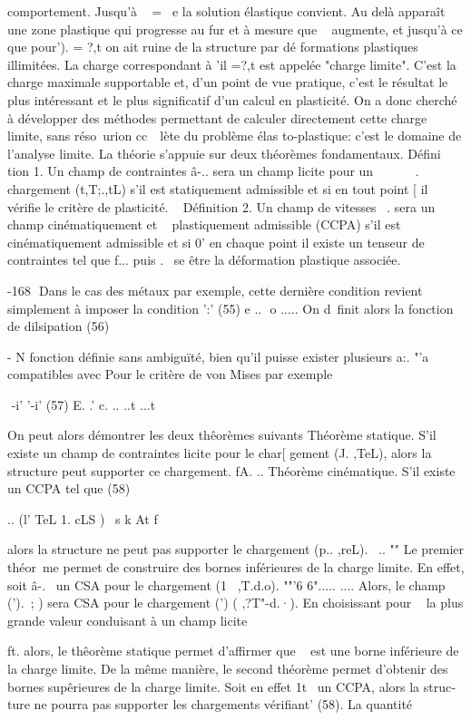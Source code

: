comportement. Jusqu'à ~ = ~e la solution élastique convient. Au delà 
apparaît une zone plastique qui progresse au fur et à mesure que ~ aug­mente, et jusqu'à ce que pour'). = ?,t on ait ruine de la structure par dé­
formations plastiques illimitées. 
La charge correspondant à 'il =?,t est appelée "charge limite". C'est la charge maximale supportable et, d'un point de vue pratique, c'est le résultat le plus intéressant et le plus significatif d'un calcul en plas­ticité. On a donc cherché à développer des méthodes permettant de calculer 
directement cette charge limite, sans réso~urion cc~~lète du problème élas­
to-plastique: c'est le domaine de l'analyse limite. 
La théorie s'appuie sur deux théorèmes fondamentaux. 
Défini tion 1. Un champ de contraintes â-.. sera un champ licite pour un 
~~~~~~. ~~ 
chargement (t,T;.,tL) s'il est statiquement admissible et si en tout point 
[ 
il vérifie le critère de plasticité. 
~ 
Définition 2. Un champ de vitesses ~. sera un champ cinématiquement et 
~ 
plastiquement admissible (CCPA) s'il est cinématiquement admissible et si 
0' 
en  chaque point  il existe  un  tenseur  de  contraintes  tel que f... puis­ 
.~  
se  être la déformation plastique associée.  

-168 ­
Dans le cas des métaux par exemple, cette dernière condition re­vient simplement à imposer la condition 
':' 
(55) e ..  o 
..... 
On d~finit alors la fonction de dilsipation 
(56) 

-
N
fonction définie sans ambiguïté, bien qu'il puisse exister plusieurs a:. 
"'a
compatibles avec Pour le critère de von Mises par exemple 

 -i' '-i'
(57) 
E. .' c. .. 
..t ...t 

On peut alors démontrer les deux thêorèmes suivants 
Théorème statique. S'il existe un champ de contraintes licite pour le char­[ gement (J. ,TeL), alors la structure peut supporter ce chargement.
fA. .. 
Théorème cinématique. S'il existe un CCPA tel que 
(58) 

.. (l' TeL 1. cLS )
~s k At 
f 

alors la structure ne peut pas supporter le chargement (p.. ,reL). 
~.. "" 
Le premier théor~me permet de construire des bornes inférieures de la charge limite. En effet, soit â-.~ un CSA pour le chargement (1~ ,T.d.o).
""'6 6"..... .... 
Alors, le champ (').~; ) sera CSA pour le chargement (') ( ,?T"-d.·). En choisissant pour ~ la plus grande valeur conduisant à un champ licite 

ft. 
alors, le thêorème statique permet d'affirmer que ~ est une borne inférieu­re de la charge limite. 
De la même manière, le second théorème permet d'obtenir des bornes supêrieures de la charge limite. Soit en effet 1t~ un CCPA, alors la struc­ture ne pourra pas supporter les chargements vérifiant' (58). La quantité 

